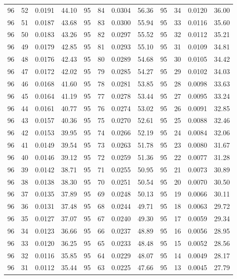 \begin{tabular}{llll|llll|llll}
96 & 52 & 0.0191 & 44.10 & 95 & 84 & 0.0304 & 56.36 & 95 & 34 & 0.0120 & 36.00\\
96 & 51 & 0.0187 & 43.68 & 95 & 83 & 0.0300 & 55.94 & 95 & 33 & 0.0116 & 35.60\\
96 & 50 & 0.0183 & 43.26 & 95 & 82 & 0.0297 & 55.52 & 95 & 32 & 0.0112 & 35.21\\
96 & 49 & 0.0179 & 42.85 & 95 & 81 & 0.0293 & 55.10 & 95 & 31 & 0.0109 & 34.81\\
96 & 48 & 0.0176 & 42.43 & 95 & 80 & 0.0289 & 54.68 & 95 & 30 & 0.0105 & 34.42\\
96 & 47 & 0.0172 & 42.02 & 95 & 79 & 0.0285 & 54.27 & 95 & 29 & 0.0102 & 34.03\\
96 & 46 & 0.0168 & 41.60 & 95 & 78 & 0.0281 & 53.85 & 95 & 28 & 0.0098 & 33.63\\
96 & 45 & 0.0164 & 41.19 & 95 & 77 & 0.0278 & 53.44 & 95 & 27 & 0.0095 & 33.24\\
96 & 44 & 0.0161 & 40.77 & 95 & 76 & 0.0274 & 53.02 & 95 & 26 & 0.0091 & 32.85\\
96 & 43 & 0.0157 & 40.36 & 95 & 75 & 0.0270 & 52.61 & 95 & 25 & 0.0088 & 32.46\\
96 & 42 & 0.0153 & 39.95 & 95 & 74 & 0.0266 & 52.19 & 95 & 24 & 0.0084 & 32.06\\
96 & 41 & 0.0149 & 39.54 & 95 & 73 & 0.0263 & 51.78 & 95 & 23 & 0.0080 & 31.67\\
96 & 40 & 0.0146 & 39.12 & 95 & 72 & 0.0259 & 51.36 & 95 & 22 & 0.0077 & 31.28\\
96 & 39 & 0.0142 & 38.71 & 95 & 71 & 0.0255 & 50.95 & 95 & 21 & 0.0073 & 30.89\\
96 & 38 & 0.0138 & 38.30 & 95 & 70 & 0.0251 & 50.54 & 95 & 20 & 0.0070 & 30.50\\
96 & 37 & 0.0135 & 37.89 & 95 & 69 & 0.0248 & 50.13 & 95 & 19 & 0.0066 & 30.11\\
96 & 36 & 0.0131 & 37.48 & 95 & 68 & 0.0244 & 49.71 & 95 & 18 & 0.0063 & 29.72\\
96 & 35 & 0.0127 & 37.07 & 95 & 67 & 0.0240 & 49.30 & 95 & 17 & 0.0059 & 29.34\\
96 & 34 & 0.0123 & 36.66 & 95 & 66 & 0.0237 & 48.89 & 95 & 16 & 0.0056 & 28.95\\
96 & 33 & 0.0120 & 36.25 & 95 & 65 & 0.0233 & 48.48 & 95 & 15 & 0.0052 & 28.56\\
96 & 32 & 0.0116 & 35.85 & 95 & 64 & 0.0229 & 48.07 & 95 & 14 & 0.0049 & 28.17\\
96 & 31 & 0.0112 & 35.44 & 95 & 63 & 0.0225 & 47.66 & 95 & 13 & 0.0045 & 27.79\\

\end{tabular}
